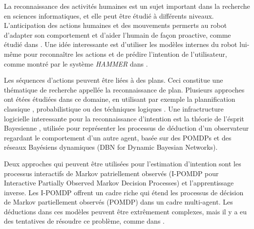 \documentclass[a4paper,11pt,twoside]{StyleThese}
\begin{document}
La reconnaissance des activités humaines est un sujet important dans la recherche en sciences informatiques, et elle peut être étudié à différents niveaux. L'anticipation des actions humaines et des mouvements permerts au robot d'adapter son comportement et d'aider l'humain de façon proactive, comme étudié dans \cite{koppula2013anticipating}. Une idée interessante est d'utiliser les modèles internes du robot lui-même pour reconnaître les actions et de prédire l'intention de l'utilisateur, comme montré par le système \textit{HAMMER} dans \cite{demiris2007prediction}. 

Les séquences d'actions peuvent être liées à des plans. Ceci constitue une thématique de recherche appellée la reconnaissance de plan. Plusieurs approches ont étées étudiées dans ce domaine, en utilisant par exemple la plannification classique \cite{ramirez2009plan}, probabilistique \cite{bui2003general} ou des téchniques logiques \cite{singla2011abductive}. Une infractructure logicielle interessante pour la reconnaissance d'intention est la théorie de l'ésprit Bayesienne \cite{baker2014modeling}, utilisée pour représenter les processus de déduction d'un observateur regardant le comportement d'un autre agent, basée sur des POMDPs et des réseaux Bayésiens dynamiques (DBN for Dynamic Bayesian Networks).

Deux approches qui peuvent être utilisées pour l'estimation d'intention sont les processus interactifs de Markov patriellement observés (I-POMDP pour Interactive Partially Observed Markov Decision Processes) et l'apprentissage inverse. Les I-POMDP \cite{gmytrasiewicz2004interactive} offrent un cadre riche qui étend les processus de décision de Markov partiellement observés (POMDP) dans un cadre multi-agent. Les déductions dans ces modèles peuvent être extrêmement complexes, mais il y a eu des tentatives de résoudre ce problème, comme dans \cite{doshi2009monte, hoang2013interactive}.



\end{document}
